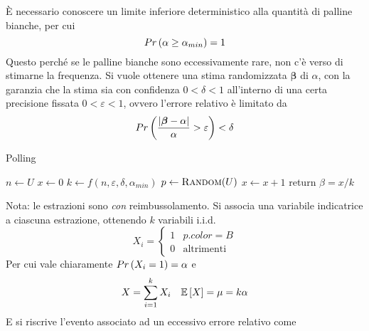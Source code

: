 È necessario conoscere un limite inferiore deterministico alla quantità di palline bianche, per cui
\begin{equation*}
    Pr\left(
        \alpha \geq \alpha_{min}
    \right) 
    = 1
\end{equation*}
Questo perché se le palline bianche sono eccessivamente rare, non c'è verso di stimarne la frequenza.
Si vuole ottenere una stima randomizzata $
\bm{\beta}
$ di $\alpha$, con la garanzia che la stima sia 
con confidenza $
0 < \delta < 1
$
all'interno di una certa precisione fissata $
0 < \varepsilon < 1
$, ovvero l'errore relativo è limitato da
\begin{equation*}
    Pr\left(
        \frac{
            |
            \bm{\beta}
            - \alpha
            |
        }{
            \alpha
        }
        > \varepsilon
    \right)
    < \delta
\end{equation*}
\begin{algorithm}[H]
\caption{Polling}\label{alg:polling}
\begin{algorithmic}[1]
        \State $n \gets U$
        \State $x \gets 0$
        \State $k \gets f \left( n, \varepsilon, \delta, \alpha_{min} \right)$
            \State $p \gets
            \Call{Random}{U}
            $
        \EndRepLoop
            \State $x \gets x + 1$
        \EndIf
        \State return $\beta = x / k$
    \EndProcedure
\end{algorithmic}
\end{algorithm}
\noindent
Nota: le estrazioni sono \emph{con} reimbussolamento.
Si associa una variabile indicatrice a ciascuna estrazione, ottenendo $k$ variabili i.i.d. 
\begin{equation*}
    X_i =
    \begin{cases}
        1 & p.color = B
        \\
        0 & \text{altrimenti}
    \end{cases}
\end{equation*}
Per cui vale chiaramente $
Pr\left(X_i = 1\right) = \alpha
$ e
\begin{equation*}
    X = \sum_{i=1}^{k} X_i
    \quad
    \mathbb{E}\left[X\right] = \mu = k \alpha
\end{equation*}
E si riscrive l'evento associato ad un eccessivo errore relativo come
